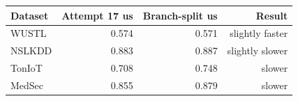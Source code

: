 \begin{tabular}{lrrr}
\toprule
Dataset & Attempt 17 us & Branch-split us & Result \\
\midrule
WUSTL & 0.574 & 0.571 & slightly faster \\
NSLKDD & 0.883 & 0.887 & slightly slower \\
TonIoT & 0.708 & 0.748 & slower \\
MedSec & 0.855 & 0.879 & slower \\
\bottomrule
\end{tabular}
